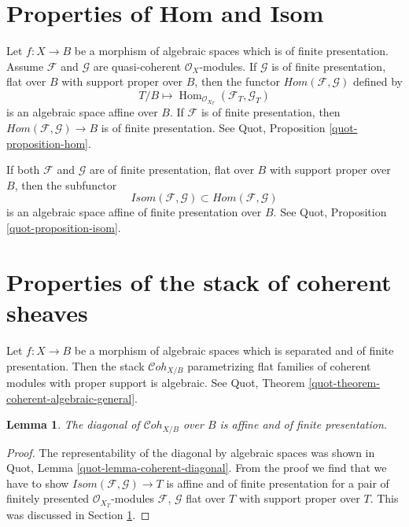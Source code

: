 \documentclass{stacks-project}
\theoremstyle{plain}
\newtheorem{lemma}[subsection]{Lemma}
\theoremstyle{definition}
\theoremstyle{remark}
\numberwithin{equation}{subsection}
\def\Hom{\mathop{\mathrm{Hom}}\nolimits}
\def\Cohstack{\mathcal{C}\!\mathit{oh}}
\begin{document}
\section{Properties of Hom and Isom}
\label{section-hom-isom}

\noindent
Let $f : X \to B$ be a morphism of algebraic spaces which is
of finite presentation. Assume $\mathcal{F}$ and $\mathcal{G}$
are quasi-coherent $\mathcal{O}_X$-modules.
If $\mathcal{G}$ is of finite presentation, flat over $B$
with support proper over $B$, then the functor
$\mathit{Hom}(\mathcal{F}, \mathcal{G})$ defined by
$$
T/B \longmapsto \Hom_{\mathcal{O}_{X_T}}(\mathcal{F}_T, \mathcal{G}_T)
$$
is an algebraic space affine over $B$. If $\mathcal{F}$ is of
finite presentation, then
$\mathit{Hom}(\mathcal{F}, \mathcal{G}) \to B$
is of finite presentation. See
Quot, Proposition \ref{quot-proposition-hom}.

\medskip\noindent
If both $\mathcal{F}$ and $\mathcal{G}$ are of finite presentation,
flat over $B$ with support proper over $B$, then the subfunctor
$$
\mathit{Isom}(\mathcal{F}, \mathcal{G}) \subset
\mathit{Hom}(\mathcal{F}, \mathcal{G})
$$
is an algebraic space affine of finite presentation over $B$.
See Quot, Proposition \ref{quot-proposition-isom}.




\section{Properties of the stack of coherent sheaves}
\label{section-stack-coherent-sheaves}

\noindent
Let $f : X \to B$ be a morphism of algebraic spaces which is
separated and of finite presentation. Then the stack
$\Cohstack_{X/B}$ parametrizing flat families of coherent
modules with proper support is algebraic. See
Quot, Theorem \ref{quot-theorem-coherent-algebraic-general}.

\begin{lemma}
\label{lemma-coherent-diagonal-affine-fp}
The diagonal of $\Cohstack_{X/B}$ over $B$ is affine
and of finite presentation.
\end{lemma}

\begin{proof}
The representability of the diagonal by algebraic spaces
was shown in Quot, Lemma \ref{quot-lemma-coherent-diagonal}.
From the proof we find that we have to show
$\mathit{Isom}(\mathcal{F}, \mathcal{G}) \to T$
is affine and of finite presentation for a pair of
finitely presented $\mathcal{O}_{X_T}$-modules
$\mathcal{F}$, $\mathcal{G}$ flat over $T$ with support
proper over $T$. This was discussed in Section \ref{section-hom-isom}.
\end{proof}
\end{document}
